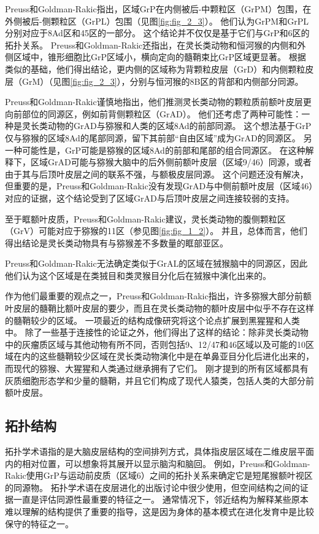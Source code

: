 Preuss和Goldman-Rakic指出，区域GrP在内侧被后-中颗粒区（GrPM）包围，在外侧被后-侧颗粒区（GrPL）包围（见图\ref{fig:fig_2_3}）。
他们认为GrPM和GrPL分别对应于8Ad区和45区的一部分。
这个结论并不仅仅是基于它们与GrP和6区的拓扑关系。
Preuss和Goldman-Rakic还指出，在灵长类动物和恒河猴的内侧和外侧区域中，锥形细胞比GrP区域小，横向定向的髓鞘束比GrP区域更显著。
根据类似的基础，他们得出结论，更内侧的区域称为背颗粒皮层（GrD）和内侧颗粒皮层（GrM）（见图\ref{fig:fig_2_3}），分别与恒河猴的8B区的背部和内侧部分同源。


Preuss和Goldman-Rakic谨慎地指出，他们推测灵长类动物的颗粒质前额叶皮层更向前部位的同源区，例如前背侧颗粒区（GrAD）。
他们还考虑了两种可能性：一种是灵长类动物的GrAD与猕猴和人类的区域8Ad的前部同源。
这个想法基于GrP仅与猕猴的区域8Ad的尾部同源，留下其前部“自由区域”成为GrAD的同源区。
另一种可能性是，GrP可能是猕猴的区域8Ad的前部和尾部的组合同源区。
在这种解释下，区域GrAD可能与猕猴大脑中的后外侧前额叶皮层（区域9/46）同源，或者由于其与后顶叶皮层之间的联系不强，与额极皮层同源\cite{preuss2007evolutionary}。
这个问题还没有解决，但重要的是，Preuss和Goldman-Rakic没有发现GrAD与中侧前额叶皮层（区域46）对应的证据，这个结论受到了区域GrAD与后顶叶皮层之间连接较弱的支持。


至于眶额叶皮质，Preuss和Goldman-Rakic建议，灵长类动物的腹侧颗粒区（GrV）可能对应于猕猴的11区（参见图\ref{fig:fig_1_2}）。
并且，总体而言，他们得出结论是灵长类动物具有与猕猴差不多数量的眶部亚区。


Preuss和Goldman-Rakic无法确定类似于GrAL的区域在狨猴脑中的同源区，因此他们认为这个区域是在类狨目和类灵猴目分化后在狨猴中演化出来的。


作为他们最重要的观点之一，Preuss和Goldman-Rakic指出，许多猕猴大部分前额叶皮层的髓鞘比额叶皮层的要少，而且在灵长类动物的额叶皮层中似乎不存在这样的髓鞘较少的区域。
一项最近的结构成像研究将这个论点扩展到黑猩猩和人类中\cite{glasser2011comparative}。
除了一些基于连接性的论证之外，他们得出了这样的结论：除非灵长类动物中的灰瘤质区域与其他动物有所不同，否则包括9、12/47和46区域以及可能的10区域在内的这些髓鞘较少区域在灵长类动物演化中是在单鼻亚目分化后进化出来的，而现代的猕猴、大猩猩和人类通过继承拥有了它们。
刚才提到的所有区域都具有灰质细胞形态学和少量的髓鞘，并且它们构成了现代人猿类，包括人类的大部分前额叶皮层。


\subsection{拓扑结构}
拓扑学术语指的是大脑皮层结构的空间排列方式，具体指皮层区域在二维皮层平面内的相对位置，可以想象将其展开以显示脑沟和脑回。
例如，Preuss和Goldman-Rakic使用GrP与运动前皮质（区域6）之间的拓扑关系来确定它是短尾猴额叶视区的同源物。
拓扑学术语在皮层进化的出版讨论中很少使用，但空间结构之间的证据一直是评估同源性最重要的特征之一。
通常情况下，邻近结构为解释某些原本难以理解的结构提供了重要的指导，这是因为身体的基本模式在进化发育中是比较保守的特征之一。


